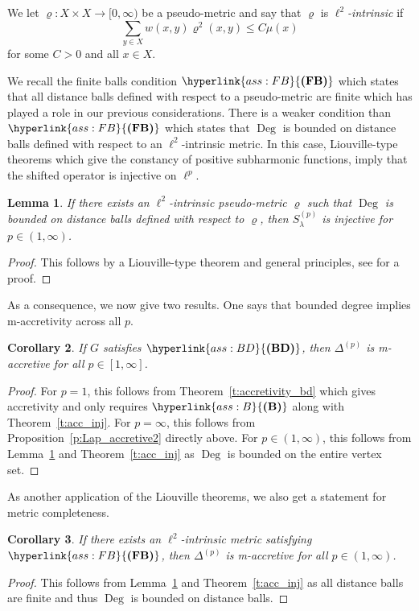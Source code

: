 \documentclass[letterpaper]{article}
\newtheorem{lemma}{Lemma}[section]
\newtheorem{corollary}[lemma]{Corollary}
\theoremstyle{definition}
\theoremstyle{named}
\numberwithin{equation}{section}
\newcommand{\B}{\hyperlink{ass:B}{\textup{\textbf{(B)}}}}
\newcommand{\BD}{\hyperlink{ass:BD}{\textup{\textbf{(BD)}}}}
\newcommand{\FB}{\hyperlink{ass:FB}{\textup{\textbf{(FB)}}}}
\newcommand{\lm}{\lambda}
\newcommand{\Deg}{\operatorname{Deg}}
\newcommand{\Dep}{\Delta^{(p)}}
\begin{document}
We let $\varrho \colon X\times X \to [0,\infty)$ 
be a pseudo-metric and 
say that $\varrho$ is \emph{$\ell^2$-intrinsic} if
$$\sum_{y \in X}w(x,y)\varrho^2(x,y) \leq C \mu(x)$$ 
for some $C>0$ and all $x \in X$. 

We recall the finite balls 
condition $\FB$ which states that all distance balls defined with respect to a pseudo-metric
are finite which has played a role in our previous considerations.
There is a weaker condition than $\FB$ which states that $\Deg$ is 
bounded on distance balls defined with respect to an $\ell^2$-intrinsic metric. 
In this case, Liouville-type theorems which give the constancy of positive
subharmonic functions, imply that the shifted operator is injective on $\ell^p$.
\begin{lemma}\label{l:Liouv}
    If there exists an $\ell^2$-intrinsic pseudo-metric $\varrho$ such that $\Deg$ is bounded
    on distance balls defined with respect to $\varrho$, then $S_\lm^{(p)}$ is injective
    for $p \in (1,\infty)$.
\end{lemma}
\begin{proof}
    This follows by a Liouville-type theorem and general principles, see
    \cite[Theorem~12.15 and Lemma~12.19]{keller2021graphs} for a proof.
\end{proof}

As a consequence, we now give two results. One says that bounded degree implies m-accretivity
across all $p$.
\begin{corollary}\label{c:Lap_accretive3}
    If $G$ satisfies $\BD$, then $\Dep$ is m-accretive for all $p \in [1,\infty]$.
\end{corollary}
\begin{proof}
    For $p=1$, this follows from Theorem~\ref{t:accretivity_bd} which gives
    accretivity and only requires $\B$ along with Theorem~\ref{t:acc_inj}.
    For $p=\infty$, this follows from Proposition~\ref{p:Lap_accretive2} directly above.
    For $p \in (1,\infty)$, this follows from Lemma~\ref{l:Liouv} and Theorem~\ref{t:acc_inj}
    as $\Deg$ is bounded on the entire vertex set. 
\end{proof}

As another application of the Liouville theorems,
we also get a statement for metric completeness.
\begin{corollary}\label{c:Lap_accretive_intrinsic}
If there exists an $\ell^2$-intrinsic metric satisfying $\FB$, then
$\Dep$ is m-accretive for all $p \in (1,\infty)$.
\end{corollary}
\begin{proof}
    This follows from Lemma~\ref{l:Liouv} and Theorem~\ref{t:acc_inj}
    as all distance balls are finite and thus $\Deg$ is bounded on distance balls. 
\end{proof}
\end{document}
